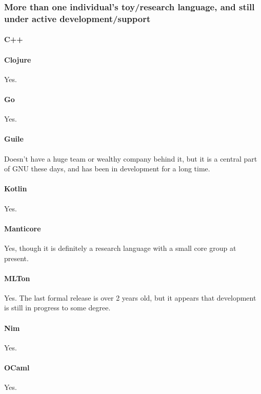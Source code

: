 \subsubsection{More than one individual's toy/research language, and still under active development/support}

\paragraph{C++}

\paragraph{Clojure}
Yes.

\paragraph{Go}
Yes.

\paragraph{Guile}
Doesn't have a huge team or wealthy company behind it, but it is a central part of GNU these days, and has been in development for a long time.

\paragraph{Kotlin}
Yes.

\paragraph{Manticore}
Yes, though it is definitely a research language with a small core group at present.

\paragraph{MLTon}
Yes.  The last formal release is over 2 years old, but it appears that development is still in progress to some degree.

\paragraph{Nim}
Yes.

\paragraph{OCaml}
Yes.


